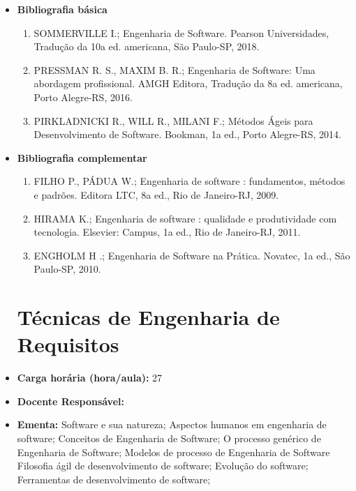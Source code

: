 \documentclass[11pt,fleqn]{book} %
\begin{document}
\begin{itemize}
	
	\item \textbf{Bibliografia básica}
	\begin{enumerate}
		\item SOMMERVILLE I.; Engenharia de Software. Pearson Universidades, Tradução da 10a ed. americana, São Paulo-SP, 2018.
		\item PRESSMAN R. S., MAXIM B. R.; Engenharia de Software: Uma abordagem profissional. AMGH Editora, Tradução da 8a ed. americana, Porto Alegre-RS, 2016.
		\item PIRKLADNICKI R., WILL R., MILANI F.; Métodos Ágeis para Desenvolvimento de Software. Bookman, 1a ed., Porto Alegre-RS, 2014.
	\end{enumerate}
	\item \textbf{Bibliografia complementar}
	\begin{enumerate}
		\item FILHO P., PÁDUA W.; Engenharia de software : fundamentos, métodos e padrões. Editora LTC, 8a ed., Rio de Janeiro-RJ, 2009.
		\item HIRAMA K.; Engenharia de software : qualidade e produtividade com tecnologia. Elsevier: Campus, 1a ed., Rio de Janeiro-RJ, 2011.
		\item ENGHOLM H .; Engenharia de Software na Prática. Novatec, 1a ed., São Paulo-SP, 2010.
	
	\end{enumerate} 	

\newpage
\section{Técnicas de Engenharia de Requisitos}\label{disc:engenharia_de_requisitos}
	
	\item \textbf{Carga horária (hora/aula):} 27
	\item \textbf{Docente Responsável:}~
	\item \textbf{Ementa:} 
    Software e sua natureza;
    Aspectos humanos em engenharia de software;
	Conceitos de Engenharia de Software;
	O processo genérico de Engenharia de Software;
	Modelos de processo de Engenharia de Software
	Filosofia ágil de desenvolvimento de software;
    Evolução do software;
    Ferramentas de desenvolvimento de software;
	

\end{itemize}
\end{document}
